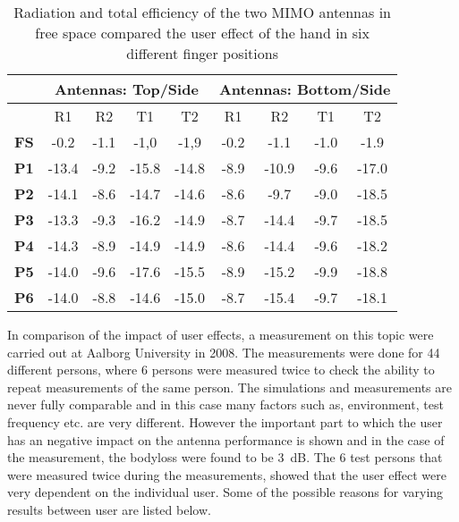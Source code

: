 \begin{table}[]
\centering
\begin{tabular}{|c|c|c|c|c|c|c|c|c|}
\hline
            & \multicolumn{4}{c|}{\textbf{Antennas: Top/Side}} & \multicolumn{4}{c|}{\textbf{Antennas: Bottom/Side}} \\ \hline
            & R1         & R2        & T1         & T2         & R1         & R2          & T1         & T2          \\ \hline
\textbf{FS} & -0.2       & -1.1      & -1,0       & -1,9       & -0.2       & -1.1        & -1.0       & -1.9        \\ \hline
\textbf{P1} & -13.4      & -9.2      & -15.8      & -14.8      & -8.9       & -10.9       & -9.6       & -17.0       \\ \hline
\textbf{P2} & -14.1      & -8.6      & -14.7      & -14.6      & -8.6       & -9.7        & -9.0       & -18.5       \\ \hline
\textbf{P3} & -13.3      & -9.3      & -16.2      & -14.9      & -8.7       & -14.4       & -9.7       & -18.5       \\ \hline
\textbf{P4} & -14.3      & -8.9      & -14.9      & -14.9      & -8.6       & -14.4       & -9.6       & -18.2       \\ \hline
\textbf{P5} & -14.0      & -9.6      & -17.6      & -15.5      & -8.9       & -15.2       & -9.9       & -18.8       \\ \hline
\textbf{P6} & -14.0      & -8.8      & -14.6      & -15.0      & -8.7       & -15.4       & -9.7       & -18.1       \\ \hline
\end{tabular}
\caption{Radiation and total efficiency of the two MIMO antennas in free space compared the user effect of the hand in six different finger positions \cite{Samantha2014UserEff}}
\label{tab:usereff_radeff}
\end{table}


In comparison of the impact of user effects, a measurement on this topic were carried out at Aalborg University in 2008.
The measurements were done for 44 different persons, where 6 persons were measured twice to check the ability to repeat measurements of the same person.  
The simulations and measurements are never fully comparable and in this case many factors such as, environment, test frequency etc. are very different. However the important part to which the user has an negative impact on the antenna performance is shown and in the case of the measurement, the bodyloss were found to be \SI{3}{dB}. The 6 test persons that were measured twice during the measurements, showed that the user effect were very dependent on the individual user. 
Some of the possible reasons for varying results between user are listed below. \cite{sanchez2008multiband}  

